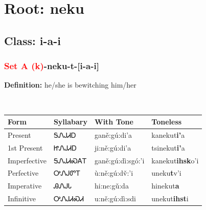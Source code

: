 \needspace{4in}
\section*{Root: neku}
\nopagebreak
{}
\needspace{3in}
\subsection*{Class: i-a-i}
\nopagebreak
\needspace{2in}
\subsubsection*{\textcolor{Red}{Set A (k)}{-}\textbf{neku}{-}t{-}[i-a-i]}
\nopagebreak
\textbf{Definition: } he/she is bewitching him/her
\\[0.5em]
\begin{tabularx}{\textwidth}{l X X X}%
\toprule%
\textbf{Form}&\textbf{Syllabary}&\textbf{With Tone}&\textbf{Toneless}\\%
\midrule%
Present&ᎦᏁᎫᏗᎠ&ganě:gú:di’a&kanekut\textbf{i'}a\\%
1st Present&ᏥᏁᎫᏗᎠ&ji:ně:gú:di’a&tsinekut\textbf{i'}a\\%
Imperfective&ᎦᏁᎫᏗᏍᎪᎢ&ganě:gú:dì:sgó:’i&kanekut\textbf{ihsk}o'i\\%
Perfective&ᎤᏁᎫᏛᎢ&ù:ně:gú:dv̌:’i&uneku\textbf{t}v'i\\%
Imperative&ᎯᏁᎫᏓ&hi:ne:gǔ:da&hinekut\textbf{a}\\%
Infinitive&ᎤᏁᎫᏗᏍᏗ&u:ně:gú:dì:sdi&unekut\textbf{ihst}i\\%
\bottomrule%
\end{tabularx}
\\[1em]